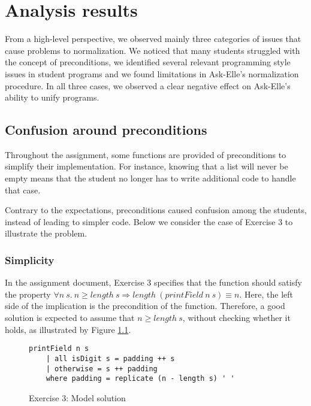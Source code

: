\chapter{Analysis results}
\label{sec:analysis-results}



From a high-level perspective, we observed mainly three categories of issues that cause problems to normalization. We noticed that many students struggled with the concept of preconditions, we identified several relevant programming style issues in student programs and we found limitations in Ask-Elle's normalization procedure. In all three cases, we observed a clear negative effect on Ask-Elle's ability to unify programs.

\section{Confusion around preconditions}

Throughout the assignment, some functions are provided of preconditions to simplify their implementation. For instance, knowing that a list will never be empty means that the student no longer has to write additional code to handle that case.

Contrary to the expectations, preconditions caused confusion among the students, instead of leading to simpler code. Below we consider the case of Exercise 3 to illustrate the problem.

\subsection{Simplicity}

In the assignment document, Exercise 3 specifies that the function  should satisfy the property $\forall n\ s.\ n \geq length\ s \Rightarrow length\ (printField\ n\ s) \equiv n$. Here, the left side of the implication is the precondition of the function. Therefore, a good solution is expected to assume that $n \geq length\ s$, without checking whether it holds, as illustrated by Figure \ref{sec:discussion-preconditions-model}.

\begin{figure}[H]
\centering
\begin{verbatim}
printField n s
    | all isDigit s = padding ++ s
    | otherwise = s ++ padding
    where padding = replicate (n - length s) ' '
\end{verbatim}
\caption{Exercise 3: Model solution}
\label{sec:discussion-preconditions-model}
\end{figure}

